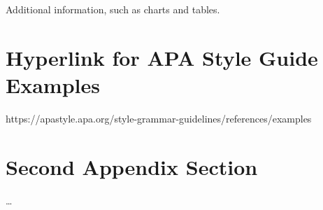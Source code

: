 

\appendix

{}	%
{}	%

Additional information, such as charts and tables.

\section{Hyperlink for APA Style Guide Examples}
		\label{Anhang-Implementierung}
		https://apastyle.apa.org/style-grammar-guidelines/references/examples

\section{Second Appendix Section}
		\dots 

\setcounter{figure}{0}

